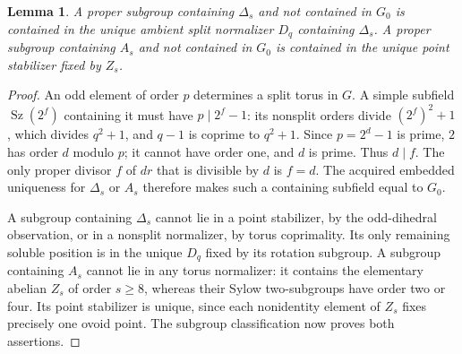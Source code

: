 \documentclass[11pt,a4paper]{article}
\newtheorem{lemma}{Lemma}\newtheorem{theorem}[lemma]{Theorem}
\newcommand{\Sz}{\operatorname{Sz}}\newcommand{\gen}[1]{\langle#1\rangle}
\begin{document}
\begin{lemma}\label{overgroups}
A proper subgroup containing $\Delta_s$ and not contained in $G_0$
is contained in the unique ambient split normalizer $D_q$ containing
$\Delta_s$. A proper subgroup containing $A_s$ and not contained in
$G_0$ is contained in the unique point stabilizer fixed by $Z_s$.
\end{lemma}
\begin{proof}
An odd element of order $p$ determines a split torus in $G$.
A simple subfield $\Sz(2^f)$ containing it must have $p\mid2^f-1$:
its nonsplit orders divide $(2^f)^2+1$, which divides $q^2+1$, and
$q-1$ is coprime to $q^2+1$. Since $p=2^d-1$ is prime,
$2$ has order $d$ modulo $p$; it cannot have order one, and $d$ is
prime. Thus $d\mid f$. The only proper divisor $f$ of $dr$ that
is divisible by $d$ is $f=d$. The acquired embedded uniqueness for
$\Delta_s$ or $A_s$ therefore makes such a containing subfield equal
to $G_0$.

A subgroup containing $\Delta_s$ cannot lie in a point stabilizer,
by the odd-dihedral observation, or in a nonsplit normalizer, by torus
coprimality. Its only remaining soluble position is in the unique
$D_q$ fixed by its rotation subgroup. A subgroup containing $A_s$
cannot lie in any torus normalizer: it contains the elementary abelian
$Z_s$ of order $s\ge8$, whereas their Sylow two-subgroups have order
two or four. Its point stabilizer is unique, since each nonidentity
element of $Z_s$ fixes precisely one ovoid point. The subgroup
classification now proves both assertions.
\end{proof}
\end{document}
